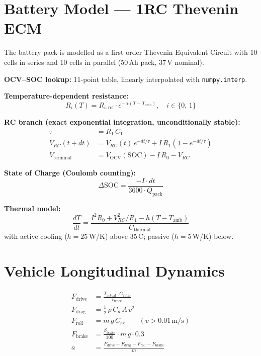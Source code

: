 \documentclass[12pt, a4paper, openany]{report}
\newcommand{\code}[1]{\texttt{#1}}
\begin{document}
\section{Battery Model --- 1RC Thevenin ECM}

The battery pack is modelled as a first-order Thevenin Equivalent Circuit
with 10 cells in series and 10 cells in parallel (50\,Ah pack, 37\,V
nominal).

\textbf{OCV--SOC lookup:} 11-point table, linearly interpolated with
\code{numpy.interp}.

\textbf{Temperature-dependent resistance:}
\[
  R_i(T) = R_{i,\text{ref}} \cdot e^{-\alpha(T - T_\text{amb})},
  \quad i \in \{0,\, 1\}
\]

\textbf{RC branch (exact exponential integration, unconditionally stable):}
\begin{align}
  \tau &= R_1\, C_1 \\
  V_{RC}(t+dt) &= V_{RC}(t)\,e^{-dt/\tau}
               + I\,R_1\!\left(1 - e^{-dt/\tau}\right) \\
  V_\text{terminal} &= V_\text{OCV}(\text{SOC}) - I\,R_0 - V_{RC}
\end{align}

\textbf{State of Charge (Coulomb counting):}
\[
  \Delta\text{SOC} = \frac{-I \cdot dt}{3600 \cdot Q_\text{pack}}
\]

\textbf{Thermal model:}
\[
  \frac{dT}{dt} = \frac{I^2 R_0 + V_{RC}^2/R_1
                        - h(T - T_\text{amb})}{C_\text{thermal}}
\]
with active cooling ($h = 25$\,W/K) above 35\,\textdegree C; passive
($h = 5$\,W/K) below.

\section{Vehicle Longitudinal Dynamics}

\begin{align}
  F_\text{drive} &= \frac{T_\text{actual} \cdot G_\text{ratio}}{r_\text{wheel}} \\
  F_\text{drag}  &= \tfrac{1}{2}\,\rho\, C_d\, A\, v^2 \\
  F_\text{roll}  &= m\, g\, C_{rr} \qquad (v > 0.01\,\text{m/s}) \\
  F_\text{brake} &= \frac{\beta_\text{brake}}{100}\cdot m\, g \cdot 0.3 \\
  a              &= \frac{F_\text{drive} - F_\text{drag} - F_\text{roll}
                         - F_\text{brake}}{m}
\end{align}
\end{document}
